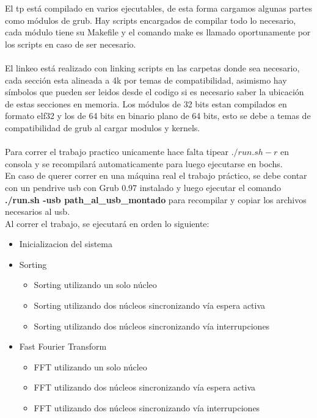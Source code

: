     El tp está compilado en varios ejecutables, de esta forma cargamos algunas partes como módulos de grub.
    Hay scripts encargados de compilar todo lo necesario, cada módulo tiene su Makefile y el comando make es llamado
    oportunamente por los scripts en caso de ser necesario.
    \\
    \\
    El linkeo está realizado con linking scripts en las carpetas donde sea necesario,
    cada sección esta alineada a 4k por temas de compatibilidad, asimismo hay símbolos que pueden ser leidos desde el codigo si es necesario saber la ubicación de estas secciones en memoria.
    Los módulos de 32 bits estan compilados en formato elf32 y los de 64 bits en binario plano de 64 bits, esto se debe a temas de compatibilidad de grub al cargar modulos y kernels.
    \\
    \\
    Para correr el trabajo practico unicamente hace falta tipear $./run.sh -r$ en consola y se recompilará automaticamente para luego ejecutarse en bochs.\\
    En caso de querer correr en una máquina real el trabajo práctico, se debe contar con un pendrive usb con Grub 0.97 instalado y luego ejecutar el comando \textbf{./run.sh -usb path\_al\_usb\_montado} para recompilar y copiar los archivos necesarios al usb.\\
    Al correr el trabajo, se ejecutará en orden lo siguiente:
    \begin{itemize}
        \item Inicializacion del sistema
        \item Sorting \begin{itemize}
                    \item Sorting utilizando un solo núcleo
                    \item Sorting utilizando dos núcleos sincronizando vía espera activa
                    \item Sorting utilizando dos núcleos sincronizando vía interrupciones
              \end{itemize}
        \item Fast Fourier Transform \begin{itemize}
                    \item FFT utilizando un solo núcleo
                    \item FFT utilizando dos núcleos sincronizando vía espera activa
                    \item FFT utilizando dos núcleos sincronizando vía interrupciones
              \end{itemize}
    \end{itemize}
